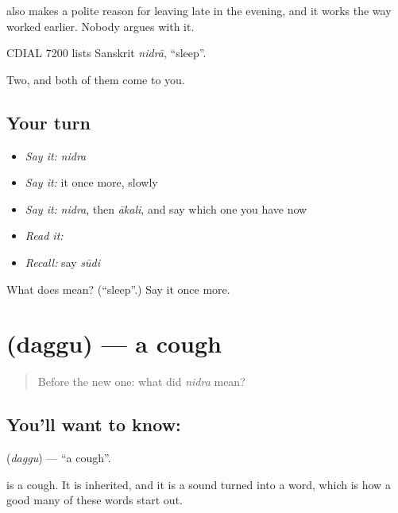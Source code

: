  also makes a polite reason for leaving late in the evening, and it works the way  worked earlier. Nobody argues with it.

CDIAL 7200 lists Sanskrit \emph{nidrā}, \textquotedblleft{}sleep\textquotedblright{}.

\begin{grammarlens}[title={What you've built}]
Two, and both of them come to you.
\end{grammarlens}

\subsection*{Your turn}
\begin{itemize}
\raggedright
  \item \emph{Say it:} \emph{nidra}
  \item \emph{Say it:} it once more, slowly
  \item \emph{Say it:} \emph{nidra}, then \emph{ākali}, and say which one you have now
  \item \emph{Read it:} \textbf{}
  \item \emph{Recall:} say \emph{sūdi}
\end{itemize}

\begin{tcolorbox}[breakable,colback=teal!4,colframe=teal!35!black,title={Before you move on}]
What does  mean? (\textquotedblleft{}sleep\textquotedblright{}.) Say it once more.
\end{tcolorbox}
\section[\texorpdfstring{\te{దగ్గు} (daggu)}{దగ్గు (daggu)}]{ (daggu) — a cough}

\label{lesson:TE-C63-cough}



\begin{quote}
Before the new one: what did \emph{nidra} mean?
\end{quote}

\subsection*{You'll want to know: }
\textbf{} (\emph{daggu}) — \textquotedblleft{}a cough\textquotedblright{}.

 is a cough. It is inherited, and it is a sound turned into a word, which is how a good many of these words start out.

